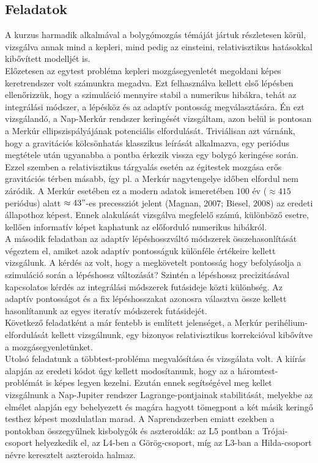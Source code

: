 \begin{multicols}{2}

\section{Feladatok} \label{sec:1}
A kurzus harmadik alkalmával a bolygómozgás témáját jártuk részletesen körül, vizsgálva annak mind a kepleri, mind pedig az einsteini, relativisztikus hatásokkal kibővített modelljét is.\\
Előzetesen az egytest probléma kepleri mozgásegyenletét megoldani képes keretrendszer volt számunkra megadva. Ezt felhasználva kellett első lépésben ellenőrizzük, hogy a szimuláció mennyire stabil a numerikus hibákra, tehát az integrálási módszer, a lépésköz és az adaptív pontosság megválasztására. Én ezt vizsgálandó, a Nap-Merkúr rendszer keringését vizsgáltam, azon belül is pontosan a Merkúr ellipszispályájának potenciális elfordulását. Triviálisan azt várnánk, hogy a gravitációs kölcsönhatás klasszikus leírását alkalmazva, egy periódus megtétele után ugyanabba a pontba érkezik vissza egy bolygó keringése során. Ezzel szemben a relativisztikus tárgyalás esetén az égitestek mozgása erős gravitációs térben másabb, így pl. a Merkúr nagytengelye időben elfordul nem záródik. A Merkúr esetében ez a modern adatok ismeretében $100$ év ($\approx 415$ periódus) alatt $\approx 43"$-es precessziót jelent (Magnan, 2007\cite{2007arXiv0712.3709M}; Biesel, 2008\cite{biesel2008precession}) az eredeti állapothoz képest. Ennek alakulását vizsgálva megfelelő számú, különböző esetre, kellően informatív képet kaphatunk az előforduló numerikus hibákról. \\
A második feladatban az adaptív lépéshosszváltó módszerek összehasonlítását végeztem el, amiket azok adaptív pontosságuk különféle értékeire kellett vizsgálunk. A kérdés az volt, hogy a megkövetelt pontosság hogy befolyásolja a szimuláció során a lépéshossz változását? Szintén a lépéshossz precizitásával kapcsolatos kérdés az integrálási módszerek futásideje közti különbség. Az adaptív pontosságot és a fix lépéshosszakat azonosra választva össze kellett hasonlítanunk az egyes iteratív módszerek futásidejét. \\
Következő feladatként a már fentebb is említett jelenséget, a Merkúr perihélium-elfordulását kellett vizsgálnunk, egy bizonyos relativisztikus korrekcióval kibővítve a mozgásegyenletünket. \\
Utolsó feladatunk a többtest-probléma megvalósítása és vizsgálata volt. A kiírás alapján az eredeti kódot úgy kellett modosítanunk, hogy az a háromtest-problémát is képes legyen kezelni. Ezután ennek segítségével meg kellet vizsgálnunk a Nap-Jupiter rendszer Lagrange-pontjainak stabilitását, melyekbe az elmélet alapján egy behelyezett és magára hagyott tömegpont a két másik keringő testhez képest mozdulatlan marad. A Naprendszerben emiatt ezekben a pontokban összegyűlnek kisbolygók és aszteroidák: az L5 pontban a Trójai-csoport helyezkedik el, az L4-ben a Görög-csoport, míg az L3-ban a Hilda-csoport névre keresztelt aszteroida halmaz.


\end{multicols}
